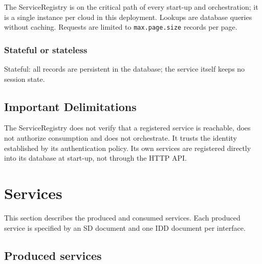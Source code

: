 \documentclass[a4paper]{arrowhead}
\begin{document}
The ServiceRegistry is on the critical path of every start-up and orchestration; it is a single instance per cloud in this deployment. Lookups are database queries without caching. Requests are limited to \texttt{max.\allowbreak{}page.\allowbreak{}size} records per page.

\subsubsection{Stateful or stateless}

Stateful: all records are persistent in the database; the service itself keeps no session state.

\subsection{Important Delimitations}
\label{sec:delimitations}

The ServiceRegistry does not verify that a registered service is reachable, does not authorize consumption and does not orchestrate. It trusts the identity established by its authentication policy. Its own services are registered directly into its database at start-up, not through the HTTP API.

\newpage

\section{Services}
\label{sec:services}

This section describes the produced and consumed services. Each produced service is specified by an SD document and one IDD document per interface.

\subsection{Produced services}
\end{document}
